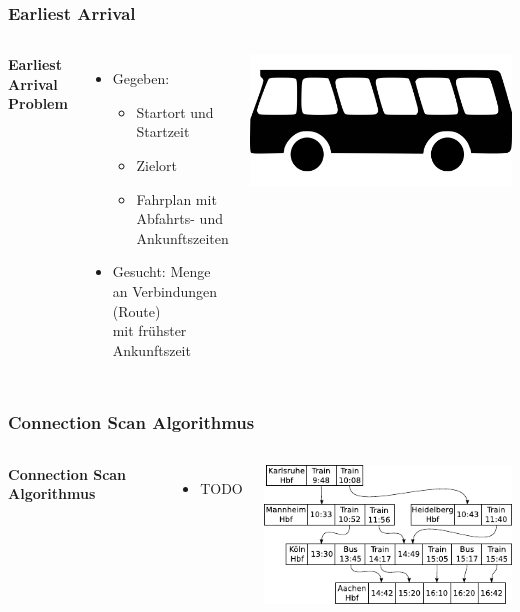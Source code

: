 \documentclass[aspectratio=169]{beamer}
\begin{document}
\begin{frame}
\frametitle{Earliest Arrival}
\begin{columns}[c] %
	
	\textbf{Earliest Arrival Problem}
	\begin{itemize}
		\item Gegeben:
		\begin{itemize}
			\item Startort und Startzeit
			\item Zielort
			\item Fahrplan mit Abfahrts- und Ankunftszeiten
		\end{itemize}
		\item Gesucht: Menge an Verbindungen (Route) \\ mit frühster Ankunftszeit
	\end{itemize}
	\includegraphics[scale=0.2]{bus.png}	
\end{columns}
\end{frame}


\begin{frame}
\frametitle{Connection Scan Algorithmus}
\begin{columns}[c] %
	
	\textbf{Connection Scan Algorithmus}
	\begin{itemize}
		\item TODO
	\end{itemize}
	\includegraphics[scale=1]{train.pdf}
	
	
\end{columns}
\end{frame}

\end{document}
